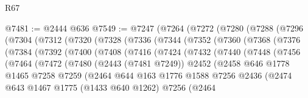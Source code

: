 \begin{lexlean}{R67}
\begin{coremodule}
@7481 := @2444 @636
@7549 := @7247
    (@7264
      (@7272
        (@7280
          (@7288
            (@7296
              (@7304
                (@7312
                  (@7320
                    (@7328
                      (@7336
                        (@7344
                          (@7352
                            (@7360
                              (@7368
                                (@7376
                                  (@7384
                                    (@7392
                                      (@7400
                                        (@7408
                                          (@7416
                                            (@7424
                                              (@7432
                                                (@7440
                                                  (@7448
                                                    (@7456
                                                      (@7464
                                                        (@7472
                                                          (@7480
                                                            (@2443 (@7481 @7249))
                                                            @2452
                                                            (@2458
                                                              @646
                                                              @1778
                                                              @1465
                                                              @7258
                                                              @7259
                                                              (@2464
                                                                @644
                                                                @163
                                                                @1776
                                                                @1588
                                                                @7256
                                                                @2436
                                                                (@2474
                                                                  @643
                                                                  @1467
                                                                  @1775
                                                                  (@1433 @640 @1262)
                                                                  @7256
                                                                  (@2464

\end{coremodule}
\end{lexlean}
